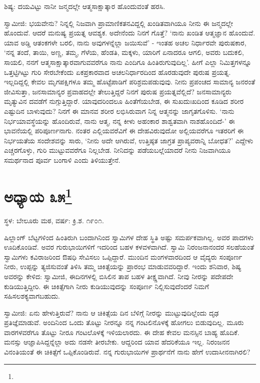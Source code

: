 ಶಿಷ್ಯ: ದಯವಿಟ್ಟು ನಾನೀ ಜನ್ಮದಲ್ಲೇ ಆತ್ಮಸಾಕ್ಷಾತ್ಕಾರ ಹೊಂದುವಂತೆ ಹರಸಿ.

ಸ್ವಾಮೀಜಿ: ಭಯವೇನು? ನಿನ್ನಲ್ಲಿ ನಿಜವಾಗಿ ಪ್ರಾಮಾಣಿಕತನವಿದ್ದಲ್ಲಿ ಖಂಡಿತವಾಗಿಯೂ ನೀನು ಈ ಜನ್ಮದಲ್ಲೇ ಹೊಂದುವೆ. ಆದರೆ ಮನುಷ್ಯ ಪ್ರಯತ್ನ ಆವಶ್ಯಕ. ಅದೇನೆಂದು ನಿನಗೆ ಗೊತ್ತೆ? ‘ನಾನು ಖಂಡಿತ ಆತ್ಮಜ್ಞಾನ ಹೊಂದುವೆ. ಯಾವ ಅಡ್ಡಿ ಆತಂಕಗಳೇ ಬರಲಿ, ನಾನು ಅವುಗಳನ್ನೆಲ್ಲಾ ಜಯಿಸುವೆ’ - ಇಂತಹ ಅಚಲ ನಿರ್ಧಾರವೇ ಪುರುಷಕಾರ, ‘ನನ್ನ ತಂದೆ, ತಾಯಿ, ಅಣ್ಣ, ತಮ್ಮ, ಗೆಳೆಯ, ಹೆಂಡತಿ, ಮಕ್ಕಳು, ಯಾರಿಗೆ ಏನಾದರೂ ಆಗಲಿ, ಅವರು ಬದುಕಲಿ, ಸಾಯಲಿ, ನನಗೆ ಆತ್ಮಸಾಕ್ಷಾತ್ಕಾರವಾಗುವವರೆಗೂ ನಾನು ಎಂದಿಗೂ ಹಿಂತಿರುಗುವುದಿಲ್ಲ’. ಹೀಗೆ ಎಲ್ಲಾ ನಿಮಿತ್ತಗಳನ್ನೂ ಒತ್ತಟ್ಟಿಗಿಟ್ಟು ಗುರಿ ಸೇರಬೇಕೆಂದು ಏಕಪ್ರಕಾರವಾದ ಅಚಲನಿರ್ಧಾರದಿಂದ ಹೊರಡುವುದೇ ಪುರುಷ ಪ್ರಯತ್ನ. ಇಲ್ಲದಿದ್ದಲ್ಲಿ ಕೇವಲ ಮೃಗಪಕ್ಷಿಗಳೂ ತಮ್ಮ ಹೊಟ್ಟೆಪಾಡಿಗೆ ಪರಿಶ್ರಮಪಡುವುವು. ನೀನು ಪ್ರಪಂಚದ ಸಾಮಾನ್ಯ ಜನರಂತೆ ಜೀವಿಸುತ್ತಾ, ಜನಸಾಮಾನ್ಯರ ಪ್ರವಾಹದಲ್ಲೇ ತೇಲುತ್ತಿದ್ದರೆ ನಿನಗೆ ಪುರುಷ ಪ್ರಯತ್ನವೆಲ್ಲಿದೆ? ಜನಸಾಮಾನ್ಯರು ಮೃತ್ಯುವಿನ ದವಡೆಗೆ ನುಗ್ಗುತ್ತಿದ್ದಾರೆ. ಯಾವುದರಿಂದಲೂ ಹಿಂತೆಗೆಯಬೇಡ, ಈ ಸುಖದುಃಖದಿಂದ ಕೂಡಿದ ಶರೀರ ಎಷ್ಟುದಿನ ಬಾಳುವುದು? ನಿನಗೆ ಈ ಮಾನವ ಶರೀರ ಲಭಿಸಿರುವಾಗ ನಿನ್ನ ಆತ್ಮನನ್ನು ಜಾಗೃತಗೊಳಿಸು. ‘ನಾನು ನಿರ್ಭಯಾವಸ್ಥೆಯನ್ನು ಹೊಂದಿರುವೆ, ನಾನು ಆತ್ಮ, ನನ್ನ ಕೀಳು ಅಹಂಕಾರ ಶಾಶ್ವತವಾಗಿ ನಾಶಹೊಂದಿದೆ-’ ಈ ಭಾವನೆಯಲ್ಲಿ ಪರಿಪೂರ್ಣನಾಗು. ನಂತರ ಎಲ್ಲಿಯವರೆವಿಗೆ ಈ ದೇಹವಿರುವುದೋ ಅಲ್ಲಿಯವರೆಗೂ ಇತರರಿಗೆ ಈ ನಿರ್ಭಯತೆಯ ಸಂದೇಶವನ್ನು ಸಾರು, ‘ನೀನು ಅದೇ ಆಗಿರುವೆ, ಉತ್ತಿಷ್ಠತ ಜಾಗ್ರತ ಪ್ರಾಪ್ಯವರಾನ್ನಿ ಬೋಧತ?’ ಎದ್ದೇಳು ಎಚ್ಚರಗೊಳ್ಳು, ಗುರಿ ಮುಟ್ಟುವವರೆಗೂ ನಿಲ್ಲಬೇಡ. ನೀನಿದನ್ನು ಪಡೆಯಬಲ್ಲೆಯಾದರೆ ನೀನು ನಿಜವಾಗಿಯೂ ಸಮರ್ಥನಾದ ಪೂರ್ವ ಬಂಗಾಳಿ ಎಂದು ತಿಳಿಯುತ್ತೇನೆ.

\newpage

\chapter[ಅಧ್ಯಾಯ ೩೫]{ಅಧ್ಯಾಯ ೩೫\protect\footnote{}}

\centerline{ಸ್ಥಳ: ಬೇಲೂರು ಮಠ, ವರ್ಷ: ಕ್ರಿ.ಶ. ೧೯೦೧.}

ಷಿಲ್ಲಾಂಗ್ ಬೆಟ್ಟಗಳಿಂದ ಹಿಂತಿರುಗಿ ಬಂದಾಗಿನಿಂದ ಸ್ವಾಮಿಗಳ ದೇಹ ಸ್ಥಿತಿ ಅಷ್ಟು ಸಮರ್ಪಕವಾಗಿಲ್ಲ. ಅವರ ಪಾದಗಳು ಊದಿಕೊಂಡಿವೆ. ಅವರ ಗುರುಭಾಯಿಗಳಿಗೆ ಇದರಿಂದ ಬಹಳ ಕಳವಳವಾಗಿದೆ. ಸ್ವಾಮಿ ನಿರಂಜನಾನಂದರ ಸಲಹೆಯಂತೆ ಸ್ವಾಮಿಗಳು ಕವಿರಾಜರಿಂದ ಔಷಧಿ ಸೇವಿಸಲು ಒಪ್ಪಿದ್ದಾರೆ. ಮುಂದಿನ ಮಂಗಳವಾರದಿಂದ ಆ ವೈದ್ಯರು ಸಂಪೂರ್ಣ ನೀರು, ಉಪ್ಪನ್ನು ತ್ಯಜಿಸುವಂತೆ ತಿಳಿಸಿ ತಮ್ಮ ಚಿಕಿತ್ಸೆಯನ್ನು ಪ್ರಾರಂಭ ಮಾಡುವವರಿದ್ದಾರೆ. ಇಂದು ಶನಿವಾರ, ಶಿಷ್ಯ ಅವರನ್ನು ಕೇಳಿದ: ಸ್ವಾಮೀಜಿ, ಈದಿನಗಳಲ್ಲಿ ಬಿಸಿಲಿನ ತಾಪ ಬಹಳ ತೀಕ್ಷ್ಣವಾಗಿದೆ. ನೀವು ನೀರನ್ನು ಪದೇಪದೇ ಕುಡಿಯುತ್ತಿದ್ದೀರಿ. ಈ ಚಿಕಿತ್ಸೆಗಾಗಿ ನೀರು ಕುಡಿಯುವುದನ್ನು ಸಂಪೂರ್ಣ ನಿಲ್ಲಿಸುವುದೆಂದರೆ ನಿಮಗೆ ಸಹಿಸಲಶಕ್ಯವಾಗಬಹುದು.

ಸ್ವಾಮೀಜಿ: ಏನು ಹೇಳುತ್ತಿರುವೆ? ನಾನು ಆ ಚಿಕಿತ್ಸೆಯ ದಿನ ಬೆಳಿಗ್ಗೆ ನೀರನ್ನು ಮುಟ್ಟುವುದಿಲ್ಲೆಂದು ದೃಢ ಪ್ರತಿಜ್ಞೆಮಾಡುವೆ. ಅಂದಿನಿಂದ ಒಂದು ತೊಟ್ಟು ನೀರನ್ನೂ ನನ್ನ ಗಂಟಲಿನೊಳಕ್ಕೆ ಹೋಗಲು ಬಿಡುವುದಿಲ್ಲ. ಮೂರು ವಾರಗಳವರೆಗೂ ತೊಟ್ಟು ನೀರೂ ಗಂಟಲೊಳಕ್ಕೆ ಇಳಿಯಲಾರದು. ಈ ದೇಹ ಕೇವಲ ಮನಸ್ಸಿನ ಬಾಹ್ಯ ಹೊದಿಕೆ. ಮನಸ್ಸು ಆಜ್ಞಾಪಿಸಿದ್ದನ್ನೆಲ್ಲಾ ಅದು ನಡಸೇ ತೀರಬೇಕು. ಆದ್ದರಿಂದ ಯಾವ ಹೆದರಿಕೆಯೂ ಇಲ್ಲ. ನಿರಂಜನನ ವಿನಂತಿಯಂತೆ ಈ ಚಿಕಿತ್ಸೆಗೆ ಒಪ್ಪಿಕೊಂಡಿರುವೆ. ನನ್ನ ಗುರುಭಾಯಿಗಳ ಪ್ರಾರ್ಥನೆಗೆ ನಾನು ಹೇಗೆ ಉದಾಸೀನನಾಗಿರಲಿ?

